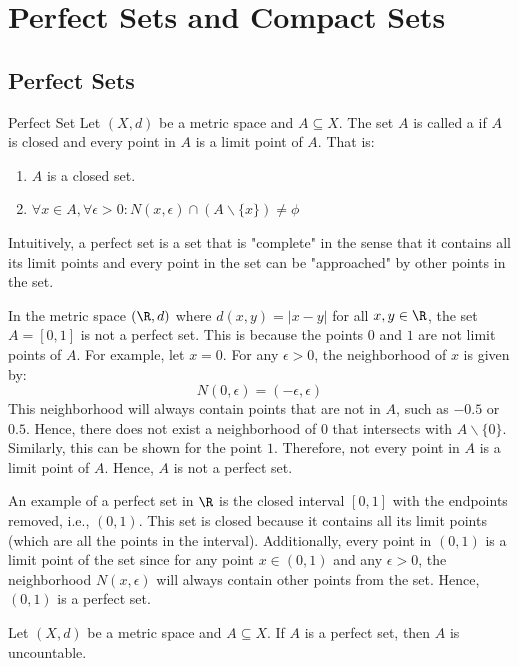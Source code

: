 \documentclass[openany]{book}
\begin{document}
\section{Perfect Sets and Compact Sets}
\subsection{Perfect Sets}
\begin{mydefinition}{Perfect Set}
    Let $(X, d)$ be a metric space and $A \subseteq X$. The set $A$ is called a  if $A$ is closed and every point in $A$ is a limit point of $A$. That is:
    \begin{enumerate}
        \item $A$ is a closed set.
        \item $\forall x \in A, \forall \epsilon > 0: N(x, \epsilon) \cap (A \backslash \{x\}) \neq \phi$
    \end{enumerate}
    Intuitively, a perfect set is a set that is "complete" in the sense that it contains all its limit points and every point in the set can be "approached" by other points in the set.
\end{mydefinition}
\begin{example}
    In the metric space $(\R, d)$ where $d(x, y) = |x - y|$ for all $x, y \in \R$, the set $A = [0, 1]$ is not a perfect set. This is because the points $0$ and $1$ are not limit points of $A$. For example, let $x = 0$. For any $\epsilon > 0$, the neighborhood of $x$ is given by:
    $$N(0, \epsilon) = (-\epsilon, \epsilon)$$
    This neighborhood will always contain points that are not in $A$, such as $-0.5$ or $0.5$. Hence, there does not exist a neighborhood of $0$ that intersects with $A \backslash \{0\}$. Similarly, this can be shown for the point $1$. Therefore, not every point in $A$ is a limit point of $A$. Hence, $A$ is not a perfect set.
\end{example}
\begin{example}
    An example of a perfect set in $\R$ is the closed interval $[0, 1]$ with the endpoints removed, i.e., $(0, 1)$. This set is closed because it contains all its limit points (which are all the points in the interval). Additionally, every point in $(0, 1)$ is a limit point of the set since for any point $x \in (0, 1)$ and any $\epsilon > 0$, the neighborhood $N(x, \epsilon)$ will always contain other points from the set. Hence, $(0, 1)$ is a perfect set.
\end{example}
\begin{mytheorem}
    Let $(X, d)$ be a metric space and $A \subseteq X$. If $A$ is a perfect set, then $A$ is uncountable.
\end{mytheorem}
\end{document}
